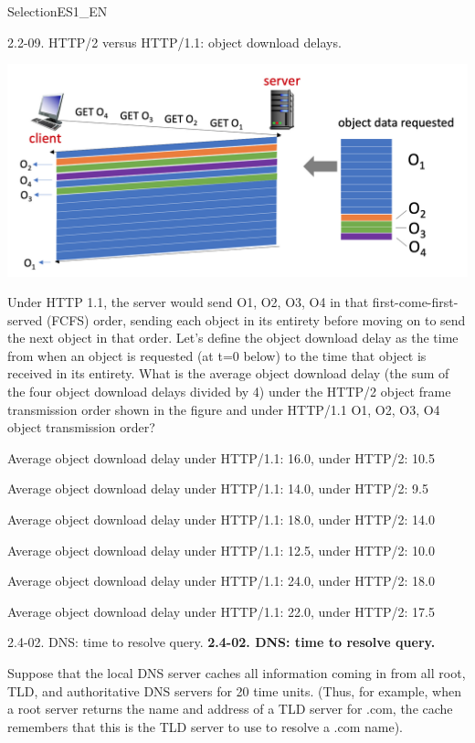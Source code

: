 \documentclass[a4paper]{article}
\begin{document}
\begin{quiz}{SelectionES1\_EN}
\begin{multi}[points=1]{2.2-09. HTTP/2 versus HTTP/1.1: object download delays.}
\begin{center}
\includegraphics[width=\linewidth]{figs/2.2.9.jpg}
\end{center}

Under HTTP 1.1, the server would send O1, O2, O3, O4 in that first-come-first-served (FCFS) order, sending each object in its entirety before moving on to send the next object in that order. Let's define the object download delay as the time from when an object is requested (at t=0 below) to the time that object is received in its entirety. What is the average object download delay (the sum of the four object download delays divided by 4) under the HTTP/2 object frame transmission order shown in the figure and under HTTP/1.1 O1, O2, O3, O4 object transmission order?
\item* Average object download delay under HTTP/1.1: 16.0, under HTTP/2: 10.5
\item Average object download delay under HTTP/1.1: 14.0, under HTTP/2: 9.5
\item Average object download delay under HTTP/1.1: 18.0, under HTTP/2: 14.0
\item Average object download delay under HTTP/1.1: 12.5, under HTTP/2: 10.0
\item Average object download delay under HTTP/1.1: 24.0, under HTTP/2: 18.0
\item Average object download delay under HTTP/1.1: 22.0, under HTTP/2: 17.5
\end{multi}

\begin{multi}[points=1,shuffle]{2.4-02. DNS: time to resolve query.}
\textbf{2.4-02. DNS: time to resolve query.}  

Suppose that the local DNS server caches all information coming in from all root, TLD, and authoritative DNS servers for 20 time units. (Thus, for example, when a root server returns the name and address of a TLD server for .com, the cache remembers that this is the TLD server to use to resolve a .com name).  


\end{multi}
\end{quiz}
\end{document}
